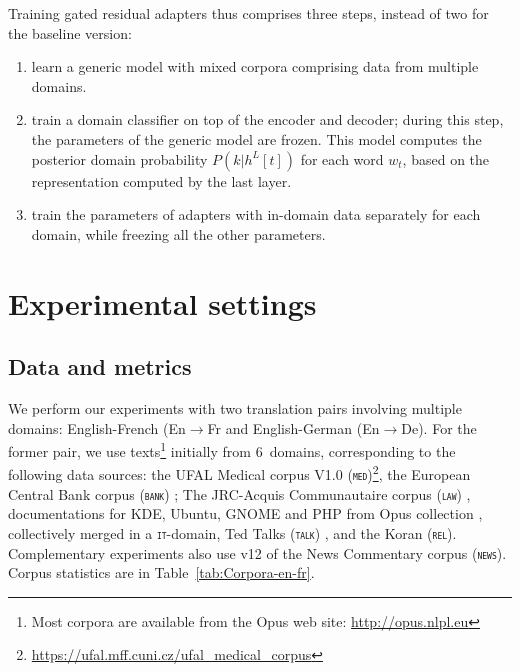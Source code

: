 \documentclass[11pt,a4paper]{article}
\newcommand{\fyFuture}[1]{\done[FY]\Todo[FY:]{\textcolor{red}{#1}}}
\newcommand{\domain}[1]{\texttt{\textsc{#1}}}
\begin{document}
Training gated residual adapters thus comprises three steps, instead of two for the baseline version:
\begin{enumerate}
\item learn a generic model with mixed corpora comprising data from multiple domains.
\item train a domain classifier on top of the encoder and decoder; during this step, the parameters of the generic model are frozen. This model computes the posterior domain probability $P(k|h^L[t])$ for each word $w_t$, based on the representation computed by the last layer.
\item train the parameters of adapters with in-domain data separately for each domain, while freezing all the other parameters.
\end{enumerate}
\fyFuture{is this classifier important, can we train with the rest of the system ?}

\section{Experimental settings \label{sec:exp}}

\subsection{Data and metrics \label{ssec:corpora}}
We perform our experiments with two translation pairs involving multiple domains: English-French (En$\rightarrow$Fr and English-German (En$\rightarrow$De). For the former pair, we use texts\footnote{Most corpora are available from the Opus web site: \url{http://opus.nlpl.eu}} initially from 6~domains, corresponding to the following data sources: the UFAL Medical corpus V1.0 (\domain{med})\footnote{\url{https://ufal.mff.cuni.cz/ufal_medical_corpus}}, the European Central Bank corpus (\domain{bank}) \cite{Tiedemann12parallel}; The JRC-Acquis Communautaire corpus (\domain{law}) \cite{Steinberger06acquis}, documentations for KDE, Ubuntu, GNOME and PHP from Opus collection \cite{Tiedemann09news}, collectively merged in a \domain{it}-domain, Ted Talks (\domain{talk}) \cite{Cettolo12wit}, and the Koran (\domain{rel}). Complementary experiments also use v12 of the News Commentary corpus (\domain{news}). Corpus statistics are in Table~\ref{tab:Corpora-en-fr}.  
\end{document}
